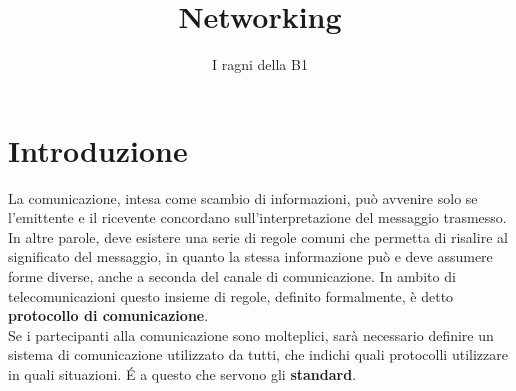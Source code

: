 \documentclass[a4paper,11pt]{article}
\title{Networking}
\author{I ragni della B1}
\begin{document}
\maketitle
\newpage
\tableofcontents
\newpage

\section*{Introduzione}
La comunicazione, intesa come scambio di informazioni, può avvenire solo se l'emittente e il ricevente concordano sull'interpretazione del messaggio trasmesso. In altre parole, deve esistere una serie di regole comuni che permetta di risalire al significato del messaggio, in quanto la stessa informazione può e deve assumere forme diverse, anche a seconda del canale di comunicazione.
In ambito di telecomunicazioni questo insieme di regole, definito formalmente, è detto \textbf{protocollo di comunicazione}. \\Se i partecipanti alla comunicazione sono molteplici, sarà necessario definire un sistema di comunicazione utilizzato da tutti, che indichi quali protocolli utilizzare in quali situazioni. \'E a questo che servono gli \textbf{standard}.
\end{document}
